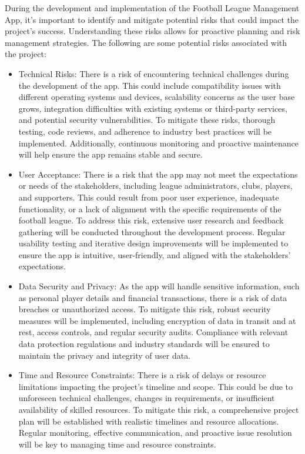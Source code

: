 \documentclass[12pt]{article}
\begin{document}
During the development and implementation of the Football League Management App, it's important to identify and mitigate potential risks that could impact the project's success. Understanding these risks allows for proactive planning and risk management strategies. The following are some potential risks associated with the project:
\begin{itemize}
    \item Technical Risks: There is a risk of encountering technical challenges during the development of the app. This could include compatibility issues with different operating systems and devices, scalability concerns as the user base grows, integration difficulties with existing systems or third-party services, and potential security vulnerabilities. To mitigate these risks, thorough testing, code reviews, and adherence to industry best practices will be implemented. Additionally, continuous monitoring and proactive maintenance will help ensure the app remains stable and secure.

    \item User Acceptance: There is a risk that the app may not meet the expectations or needs of the stakeholders, including league administrators, clubs, players, and supporters. This could result from poor user experience, inadequate functionality, or a lack of alignment with the specific requirements of the football league. To address this risk, extensive user research and feedback gathering will be conducted throughout the development process. Regular usability testing and iterative design improvements will be implemented to ensure the app is intuitive, user-friendly, and aligned with the stakeholders' expectations.

    \item Data Security and Privacy: As the app will handle sensitive information, such as personal player details and financial transactions, there is a risk of data breaches or unauthorized access. To mitigate this risk, robust security measures will be implemented, including encryption of data in transit and at rest, access controls, and regular security audits. Compliance with relevant data protection regulations and industry standards will be ensured to maintain the privacy and integrity of user data.

    \item Time and Resource Constraints: There is a risk of delays or resource limitations impacting the project's timeline and scope. This could be due to unforeseen technical challenges, changes in requirements, or insufficient availability of skilled resources. To mitigate this risk, a comprehensive project plan will be established with realistic timelines and resource allocations. Regular monitoring, effective communication, and proactive issue resolution will be key to managing time and resource constraints.


\end{itemize}
\end{document}
